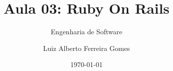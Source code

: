 \author{Luiz Alberto Ferreira Gomes}
\title{Aula 03: Ruby On Rails}
\subtitle{Engenharia de Software}
\date{\today}
